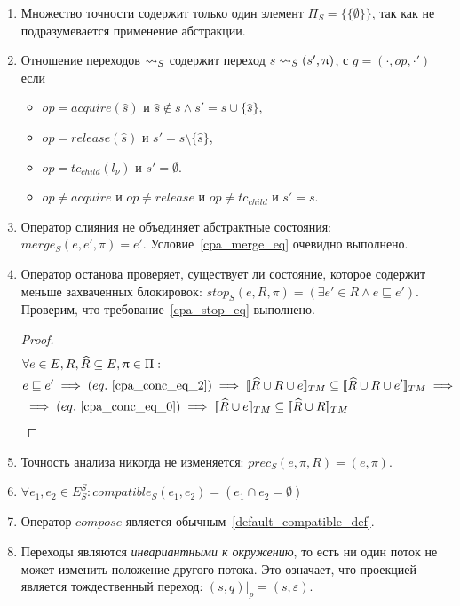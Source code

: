 \begin{enumerate}
\item Множество точности содержит только один элемент $\Pi_S = \{\{\emptyset\}\}$, так как не подразумевается применение абстракции.

\item Отношение переходов $\leadsto_S$ содержит переход $s \leadsto_S (s', \uppi)$, с $g=(\cdot,op,\cdot')$ если 
\begin{itemize}
\item $op=acquire(\hat s)$ и $\hat s \notin s \land s' = s \cup \{\hat s\}$,
\item $op=release(\hat s)$ и $s' = s \setminus \{\hat s\}$,
\item $op=tc_{child}(l_\nu)$ и $s' = \emptyset$. 
\item $op \neq acquire$ и $op \neq release$ и $op \neq tc_{child}$ и $s' = s$.
\end{itemize}

\item Оператор слияния не объединяет абстрактные состояния: $merge_S(e, e', \pi) = e'$. Условие~\ref{cpa_merge_eq} очевидно выполнено.

\item Оператор останова проверяет, существует ли состояние, которое содержит меньше захваченных блокировок: $stop_S(e, R, \pi) = (\exists e' \in R \land e \sqsubseteq e')$.
Проверим, что требование~\ref{cpa_stop_eq} выполнено.
\begin{proof}
\begin{align*}
&\forall e \in E, R, \widehat{R} \subseteq E, \pi \in \Pi: \\
& e \sqsubseteq e' \implies (eq.~\ref{cpa_conc_eq_2}) \implies \conctm{\widehat{R} \cup R \cup e} \subseteq \conctm{\widehat{R} \cup R \cup e'} \implies \\
& \implies (eq.~\ref{cpa_conc_eq_0}) \implies \conctm{\widehat{R} \cup e} \subseteq \conctm{\widehat{R} \cup R} 
\end{align*}
\end{proof}

\item Точность анализа никогда не изменяется: $prec_S(e, \pi, R) = (e, \pi)$.

\item $\forall e_1, e_2 \in E^S_S: compatible_S(e_1,e_2) = (e_1 \cap e_2 = \emptyset)$

\item Оператор $compose$ является обычным~\ref{default_compatible_def}.

\item Переходы являются {\em инвариантными к окружению}, то есть ни один поток не может изменить положение другого потока.
Это означает, что проекцией является тождественный переход:
$(s, q)|_p = (s, \varepsilon)$.
\end{enumerate}


